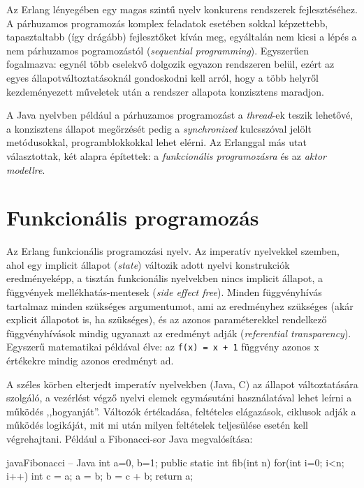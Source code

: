 \documentclass[12pt, a4paper, oneside]{book}
\begin{document}
Az Erlang lényegében egy magas szintű nyelv konkurens rendszerek
fejlesztéséhez. A párhuzamos programozás komplex feladatok esetében sokkal
képzettebb, tapasztaltabb (így drágább) fejlesztőket kíván meg, egyáltalán nem
kicsi a lépés a nem párhuzamos pogramozástól (\emph{sequential programming}).
Egyszerűen fogalmazva: egynél több cselekvő dolgozik egyazon rendszeren belül,
ezért az egyes állapotváltoztatásoknál gondoskodni kell arról, hogy a több
helyről kezdeményezett műveletek után a rendszer allapota konzisztens maradjon.

A Java nyelvben például a párhuzamos programozást a \emph{thread}-ek teszik
lehetővé, a konzisztens állapot megőrzését pedig a \emph{synchronized}
kulcsszóval jelölt metódusokkal, programblokkokkal lehet elérni. Az Erlanggal
más utat választottak, két alapra építettek: a \emph{funkcionális
programozásra} és az \emph{aktor modellre}.
 
\section{Funkcionális programozás} 

Az Erlang funkcionális programozási nyelv. Az imperatív nyelvekkel szemben,
ahol egy implicit állapot (\emph{state}) változik adott nyelvi konstrukciók
eredményeképp, a tisztán funkcionális nyelvekben nincs implicit állapot, a
függvények mellékhatás-mentesek (\emph{side effect free}). Minden függvényhívás
tartalmaz minden szükséges argumentumot, ami az eredményhez szükséges (akár
explicit állapotot is, ha szükséges), és az azonos paraméterekkel rendelkező
függvényhívások mindig ugyanazt az eredményt adják (\emph{referential
transparency}). Egyszerű matematikai példával élve: az \texttt{f(x) = x + 1}
függvény azonos x értékekre mindig azonos eredményt ad.

A széles körben elterjedt imperatív nyelvekben (Java, C) az állapot
változtatására szolgáló, a vezérlést végző nyelvi elemek egymásutáni
használatával lehet leírni a működés ,,hogyanját''. Változók értékadása,
feltételes elágazások, ciklusok adják a működés logikáját, mit mi után milyen
feltételek teljesülése esetén kell végrehajtani. Például a Fibonacci-sor Java
megvalósítása:

\begin{code}{java}{Fibonacci -- Java}
int a=0, b=1;
public static int fib(int n) {
  for(int i=0; i<n; i++) {
    int c = a;
    a = b;
    b = c + b;
  }
  return a;
}
\end{code}
\end{document}
